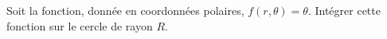 
\begin{exercice}\label{exoOutilsMath-0108}

    Soit la fonction, donnée en coordonnées polaires, $f(r,\theta)=\theta$. Intégrer cette fonction sur le cercle de rayon $R$.

\end{exercice}

